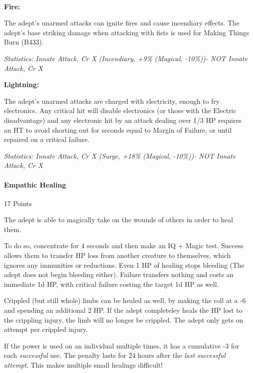 \begin{multicols}{3}
	\textbf{\\Fire:}
	
	The adept's unarmed attacks can ignite fires and cause incendiary effects. The adept's base striking damage when attacking with fists is used for Making Things Burn (B433).

	\textcolor{OliveGreen}{\textit{Statistics: Innate Attack, Cr X (Incendiary, +9\% (Magical, -10\%))- NOT Innate Attack, Cr X }}
	
	\textbf{Lightning:}
	
	The adept's unarmed attacks are charged with electricity, enough to fry electronics. Any critical hit will disable electronics (or those with the Electric disadvantage) and any electronic hit by an attack dealing over 1/3 HP requires an HT to avoid shorting out for seconds equal to Margin of Failure, or until repaired on a critical failure.
	
	\textcolor{OliveGreen}{\textit{Statistics: Innate Attack, Cr X (Surge, +18\% (Magical, -10\%))- NOT Innate Attack, Cr X }}
	
	\paragraph{Empathic Healing}
	\begin{flushright}
		17 Points
	\end{flushright}

	The adept is able to magically take on the wounds of others in order to heal them.
	
	To do so, concentrate for 4 seconds and then make an IQ + Magic test. Success allows them to transfer HP loss from another creature to themselves, which ignores any immunities or reductions. Even 1 HP of healing stops bleeding (The adept does not begin bleeding either). Failure transfers nothing and costs an immediate 1d HP, with critical failure costing the target 1d HP as well.
	
	Crippled (but still whole) limbs can be healed as well, by making the roll at a -6 and spending an additional 2 HP. If the adept completeley heals the HP lost to the crippling injury, the limb will no longer be crippled. The adept only gets on attempt per crippled injury.
	
	If the power is used on an individual multiple times, it has a cumulative -3 for each \textit{successful} use. The penalty lasts for 24 hours after the \textit{last successful attempt}. This makes multiple small healings difficult!
	

\end{multicols}
